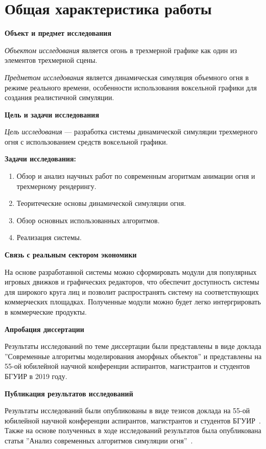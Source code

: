 \part*{Общая характеристика работы}

\textbf{Объект и предмет исследования}

\emph{Объектом исследования} является огонь в трехмерной графике как один из
элементов трехмерной сцены.

\emph{Предметом исследования} является динамическая симуляция объемного огня в
режиме реального времени, особенности использования воксельной графики для
создания реалистичной симуляции.

\textbf{Цель и задачи исследования}

\emph{Цель исследования} --- разработка системы динамической симуляции
трехмерного огня с использованием средств воксельной графики.

\textbf{Задачи исследования:}

\begin{enumerate}
	\item Обзор и анализ научных работ по современным агоритмам анимации огня и
        трехмерному рендерингу.
	\item Теоритеческие основы динамической симуляции огня.
	\item Обзор основных использованных алгоритмов.
	\item Реализация системы.
\end{enumerate}

\textbf{Связь с реальным сектором экономики}

На основе разработанной системы можно сформировать модули для популярных игровых
движков и графических редакторов, что обеспечит доступность системы для широкого
круга лиц и позволит распространять систему на соответствующих коммерческих
площадках. Полученные модули можно будет легко интергрировать в коммерческие
продукты.

\textbf{Апробация диссертации}

Результаты исследований по теме диссертации были представлены в виде доклада
''Современные алгоритмы моделирования аморфных объектов'' и представлены на
55-ой юбилейной научной конференции аспирантов, магистрантов и студентов БГУИР
в 2019 году.

\textbf{Публикация результатов исследований}

Результаты исследований были опубликованы в виде тезисов доклада на 55-ой
юбилейной научной конференции аспирантов, магистрантов и студентов
БГУИР~\cite{55_sntk}.  Также на основе полученных в ходе исследований
результатов была опубликована статья ''Анализ современных алгоритмов симуляции
огня''~\cite{mol_uch}.
